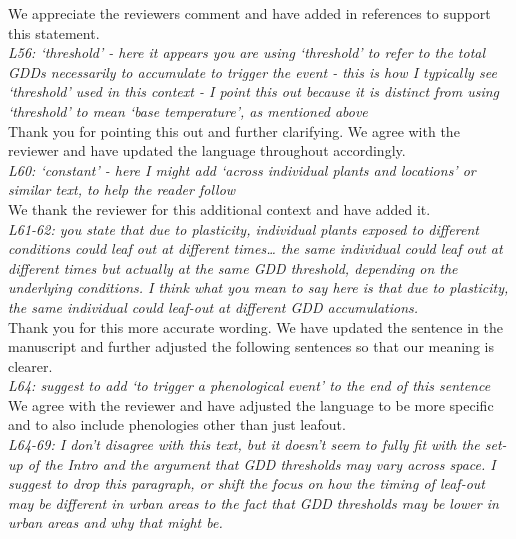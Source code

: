 \documentclass[11pt,a4paper]{article}\usepackage[]{graphicx}\usepackage[]{color}
\begin{document}
We appreciate the reviewers comment and have added in references to support this statement. \\

\textit{L56: `threshold' - here it appears you are using `threshold' to refer to the total GDDs necessarily to accumulate to trigger the event - this is how I typically see `threshold' used in this context - I point this out because it is distinct from using `threshold' to mean `base temperature', as mentioned above} \\

Thank you for pointing this out and further clarifying. We agree with the reviewer and have updated the language throughout accordingly. \\

\textit{L60: `constant' - here I might add `across individual plants and locations' or similar text, to help the reader follow} \\

We thank the reviewer for this additional context and have added it. \\

\textit{L61-62: you state that due to plasticity, individual plants exposed to different conditions could leaf out at different times… the same individual could leaf out at different times but actually at the same GDD threshold, depending on the underlying conditions. I think what you mean to say here is that due to plasticity, the same individual could leaf-out at different GDD accumulations.} \\

Thank you for this more accurate wording. We have updated the sentence in the manuscript and further adjusted the following sentences so that our meaning is clearer. \\

\textit{L64: suggest to add `to trigger a phenological event' to the end of this sentence} \\

We agree with the reviewer and have adjusted the language to be more specific and to also include phenologies other than just leafout. \\

\textit{L64-69: I don't disagree with this text, but it doesn't seem to fully fit with the set-up of the Intro and the argument that GDD thresholds may vary across space. I suggest to drop this paragraph, or shift the focus on how the timing of leaf-out may be different in urban areas to the fact that GDD thresholds may be lower in urban areas and why that might be.} \\
\end{document}
